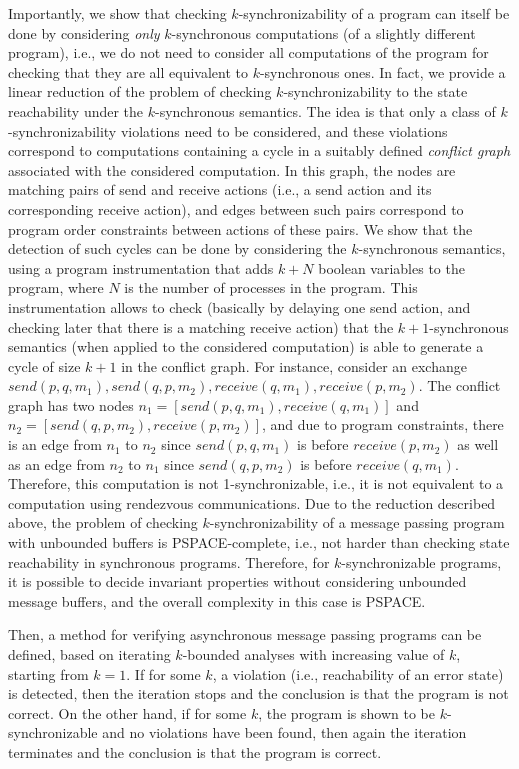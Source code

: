 Importantly, we show that checking $k$-synchronizability of a program can itself be done by considering {\em only} $k$-synchronous computations (of a slightly different program), i.e., we do not need to consider all computations of the program for checking that they are all equivalent to $k$-synchronous ones. In fact, we provide a linear reduction of the problem of checking $k$-synchronizability to the state reachability under the $k$-synchronous semantics. The idea is that only a class of $k$-synchronizability violations need to be considered, and these violations correspond to computations containing a cycle in a suitably defined {\em conflict graph} associated with the considered computation. In this graph, the nodes are matching pairs of send and receive actions (i.e., a send action and its corresponding receive action), and edges between such pairs correspond to program order constraints between actions of these pairs. We show that the detection of such cycles can be done by considering the $k$-synchronous semantics, using a program instrumentation that adds $k + N$ boolean variables to the program, where $N$ is the number of processes in the program. This instrumentation allows to check (basically by delaying one send action, and checking later that there is a matching receive action) that the $k+1$-synchronous semantics (when applied to the considered computation) is able to generate a cycle of size $k+1$ in the conflict graph. For instance, consider an exchange $send (p, q, m_1), send (q, p, m_2), receive (q, m_1), receive (p, m_2)$. The conflict graph has two nodes $n_1 = [ send(p, q, m_1), receive (q, m_1) ]$ and $n_2 = [ send(q, p, m_2), receive (p, m_2) ]$, and due to program constraints, there is an edge from $n_1$ to $n_2$ since $send(p, q, m_1)$ is before $receive (p, m_2)$ as well as an edge from $n_2$ to $n_1$ since $send(q, p, m_2)$ is before $receive (q, m_1)$. Therefore, this computation is not 1-synchronizable, i.e., it is not equivalent to a computation using rendezvous communications. 
Due to the reduction described above, the problem of checking $k$-synchronizability of a message passing program with unbounded buffers is PSPACE-complete, i.e., not harder than checking state reachability in synchronous programs. Therefore, for $k$-synchronizable programs, it is possible to decide invariant properties without considering unbounded message buffers, and the overall complexity in this case is PSPACE. 

Then, a method for verifying asynchronous message passing programs can be defined, 
based on iterating $k$-bounded analyses with increasing value of $k$, starting from $k=1$. If for some $k$, a violation (i.e., reachability of an error state) is detected, then the iteration stops and the conclusion is that the program is not correct. On the other hand, if for some $k$, the program is shown to be $k$-synchronizable and no violations have been found, then again the iteration terminates and the conclusion is that the program is correct. 

